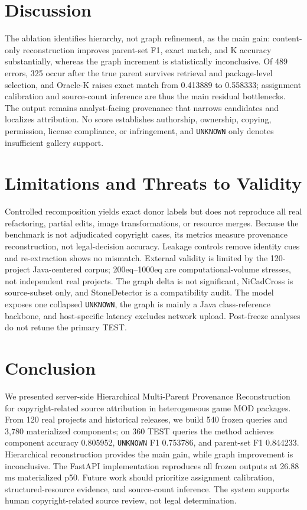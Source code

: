 \documentclass[runningheads]{llncs}
\begin{document}
\section{Discussion}
The ablation identifies hierarchy, not graph refinement, as the main gain: content-only reconstruction improves parent-set F1, exact match, and K accuracy substantially, whereas the graph increment is statistically inconclusive. Of 489 errors, 325 occur after the true parent survives retrieval and package-level selection, and Oracle-K raises exact match from 0.413889 to 0.558333; assignment calibration and source-count inference are thus the main residual bottlenecks. The output remains analyst-facing provenance that narrows candidates and localizes attribution. No score establishes authorship, ownership, copying, permission, license compliance, or infringement, and \texttt{UNKNOWN} only denotes insufficient gallery support.

\section{Limitations and Threats to Validity}
Controlled recomposition yields exact donor labels but does not reproduce all real refactoring, partial edits, image transformations, or resource merges. Because the benchmark is not adjudicated copyright cases, its metrics measure provenance reconstruction, not legal-decision accuracy. Leakage controls remove identity cues and re-extraction shows no mismatch. External validity is limited by the 120-project Java-centered corpus; 200eq--1000eq are computational-volume stresses, not independent real projects. The graph delta is not significant, NiCadCross is source-subset only, and StoneDetector is a compatibility audit. The model exposes one collapsed \texttt{UNKNOWN}, the graph is mainly a Java class-reference backbone, and host-specific latency excludes network upload. Post-freeze analyses do not retune the primary TEST.

\section{Conclusion}
We presented server-side Hierarchical Multi-Parent Provenance Reconstruction for copyright-related source attribution in heterogeneous game MOD packages. From 120 real projects and historical releases, we build 540 frozen queries and 3,780 materialized components; on 360 TEST queries the method achieves component accuracy 0.805952, \texttt{UNKNOWN} F1 0.753786, and parent-set F1 0.844233. Hierarchical reconstruction provides the main gain, while graph improvement is inconclusive. The FastAPI implementation reproduces all frozen outputs at 26.88 ms materialized p50. Future work should prioritize assignment calibration, structured-resource evidence, and source-count inference. The system supports human copyright-related source review, not legal determination.

\begingroup
\renewcommand\small{\fontsize{8}{8.5}\selectfont}


\endgroup
\end{document}
